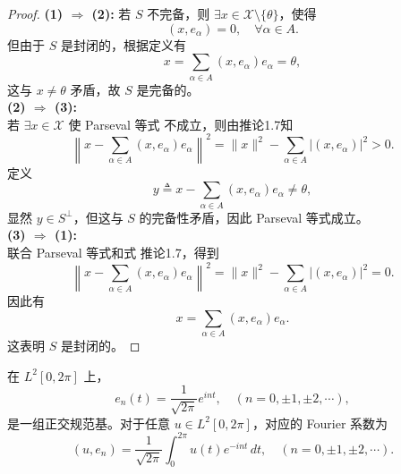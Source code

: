 \documentclass[lang=cn,newtx,10pt,scheme=chinese,thmcnt=chapter]{elegantbook}
\begin{document}
\begin{proof}
\noindent\textbf{(1) $\Longrightarrow$ (2):}  
若 $S$ 不完备，则 $\exists x \in \mathscr{X} \setminus \{\theta\}$，使得
\begin{equation}
\left(x, e_\alpha\right) = 0, \quad \forall \alpha \in A.
\end{equation}
但由于 $S$ 是封闭的，根据定义有
\begin{equation*}
x = \sum_{\alpha \in A}\left(x, e_\alpha\right)e_\alpha = \theta,
\end{equation*}
这与 $x \neq \theta$ 矛盾，故 $S$ 是完备的。\\
\noindent\textbf{(2) $\Longrightarrow$ (3):}  \\
若 $\exists x \in \mathscr{X}$ 使 Parseval 等式  不成立，则由推论1.7知
\begin{equation}
\left\|x - \sum_{\alpha \in A}\left(x, e_\alpha\right)e_\alpha\right\|^2 = \|x\|^2 - \sum_{\alpha \in A}\left|\left(x, e_\alpha\right)\right|^2 > 0. 
\end{equation}
定义
\begin{equation*}
y \triangleq x - \sum_{\alpha \in A}\left(x, e_\alpha\right)e_\alpha \neq \theta,
\end{equation*}
显然 $y \in S^\perp$，但这与 $S$ 的完备性矛盾，因此 Parseval 等式成立。\\
\noindent\textbf{(3) $\Longrightarrow$ (1):} \\
联合 Parseval 等式和式 推论1.7，得到
\begin{equation}
\left\|x - \sum_{\alpha \in A}\left(x, e_\alpha\right)e_\alpha\right\|^2 = \|x\|^2 - \sum_{\alpha \in A}\left|\left(x, e_\alpha\right)\right|^2 = 0. 
\end{equation}
因此有
\begin{equation*}
x = \sum_{\alpha \in A}\left(x, e_\alpha\right)e_\alpha.
\end{equation*}
这表明 $S$ 是封闭的。
\end{proof}
\begin{example}
在 $L^2[0,2\pi]$ 上，
\begin{equation*}
e_n(t) = \frac{1}{\sqrt{2\pi}} e^{i n t}, \quad (n = 0, \pm 1, \pm 2, \cdots),
\end{equation*}
是一组正交规范基。对于任意 $u \in L^2[0,2\pi]$，对应的 Fourier 系数为
\begin{equation*}
\left(u, e_n\right) = \frac{1}{\sqrt{2\pi}} \int_0^{2\pi} u(t) e^{-i n t} \, dt, \quad (n = 0, \pm 1, \pm 2, \cdots).
\end{equation*}
\end{example}
\end{document}
